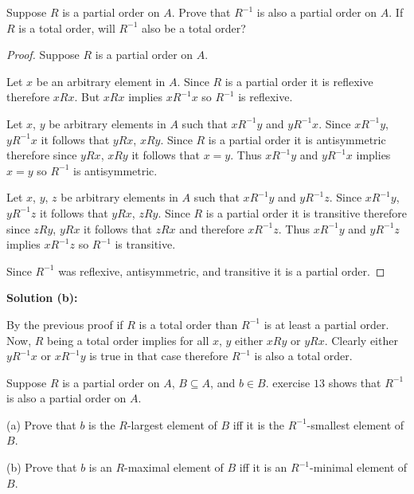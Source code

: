 \begin{tcolorbox}[title=Problem 13, breakable]
    Suppose $R$ is a partial order on $A$. Prove that $R^{-1}$
    is also a partial order on $A$. If $R$ is a total order,
    will $R^{-1}$ also be a total order?
\end{tcolorbox}

\begin{proof}
    Suppose $R$ is a partial order on $A$.

    Let $x$ be an arbitrary element in $A$.
    Since $R$ is a partial order it is reflexive therefore $xRx$.
    But $xRx$ implies $xR^{-1}x$ so $R^{-1}$ is reflexive.

    Let $x$, $y$ be arbitrary elements in $A$ such that $xR^{-1}y$ and $yR^{-1}x$.
    Since $xR^{-1}y$, $yR^{-1}x$ it follows that $yRx$, $xRy$.
    Since $R$ is a partial order it is antisymmetric therefore since $yRx$, $xRy$
        it follows that $x = y$.
    Thus $xR^{-1}y$ and $yR^{-1}x$ implies $x = y$ so $R^{-1}$ is antisymmetric.

    Let $x$, $y$, $z$ be arbitrary elements in $A$ such that $xR^{-1}y$ and $yR^{-1}z$.
    Since $xR^{-1}y$, $yR^{-1}z$ it follows that $yRx$, $zRy$.
    Since $R$ is a partial order it is transitive therefore since $zRy$, $yRx$
        it follows that $zRx$ and therefore $xR^{-1}z$.
    Thus $xR^{-1}y$ and $yR^{-1}z$ implies $xR^{-1}z$ so $R^{-1}$ is transitive.

    Since $R^{-1}$ was reflexive, antisymmetric, and transitive it is a partial order.
\end{proof}

\textbf{Solution (b):}

By the previous proof if $R$ is a total order than $R^{-1}$ is at least a partial order.
Now, $R$ being a total order implies for all $x$, $y$ either $xRy$ or $yRx$.
Clearly either $yR^{-1}x$ or $xR^{-1}y$ is true in that case therefore $R^{-1}$ is 
also a total order.

\begin{tcolorbox}[title=Problem 14, breakable]
    Suppose $R$ is a partial order on $A$, $B \subseteq A$, and $b \in B$.
    exercise $13$ shows that $R^{-1}$ is also a partial order on $A$.

    (a) Prove that $b$ is the $R$-largest element of $B$ iff it is the $R^{-1}$-smallest
        element of $B$.

    (b) Prove that $b$ is an $R$-maximal element of $B$ iff it is an $R^{-1}$-minimal 
        element of $B$.
\end{tcolorbox}

